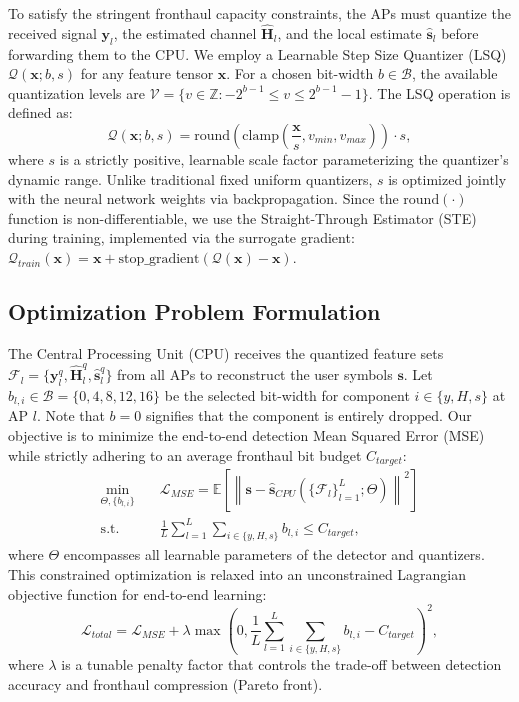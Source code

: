 To satisfy the stringent fronthaul capacity constraints, the APs must quantize the received signal $\mathbf{y}_l$, the estimated channel $\hat{\mathbf{H}}_l$, and the local estimate $\hat{\mathbf{s}}_l$ before forwarding them to the CPU. We employ a Learnable Step Size Quantizer (LSQ) $\mathcal{Q}(\mathbf{x}; b, s)$ for any feature tensor $\mathbf{x}$. For a chosen bit-width $b \in \mathcal{B}$, the available quantization levels are $\mathcal{V} = \{v \in \mathbb{Z} : -2^{b-1} \le v \le 2^{b-1}-1\}$. The LSQ operation is defined as:
\begin{equation}
    \mathcal{Q}(\mathbf{x}; b, s) = \text{round}\left( \text{clamp}\left( \frac{\mathbf{x}}{s}, v_{min}, v_{max} \right) \right) \cdot s,
\end{equation}
where $s$ is a strictly positive, learnable scale factor parameterizing the quantizer's dynamic range. Unlike traditional fixed uniform quantizers, $s$ is optimized jointly with the neural network weights via backpropagation. Since the $\text{round}(\cdot)$ function is non-differentiable, we use the Straight-Through Estimator (STE) during training, implemented via the surrogate gradient: $\mathcal{Q}_{train}(\mathbf{x}) = \mathbf{x} + \text{stop\_gradient}(\mathcal{Q}(\mathbf{x}) - \mathbf{x})$.

\subsection{Optimization Problem Formulation}
The Central Processing Unit (CPU) receives the quantized feature sets $\mathcal{F}_l = \{\mathbf{y}_l^q, \hat{\mathbf{H}}_l^q, \hat{\mathbf{s}}_l^q\}$ from all APs to reconstruct the user symbols $\mathbf{s}$. Let $b_{l,i} \in \mathcal{B} = \{0, 4, 8, 12, 16\}$ be the selected bit-width for component $i \in \{y, H, s\}$ at AP $l$. Note that $b=0$ signifies that the component is entirely dropped. Our objective is to minimize the end-to-end detection Mean Squared Error (MSE) while strictly adhering to an average fronthaul bit budget $C_{target}$:
\begin{align}
    \min_{\Theta, \{b_{l,i}\}} \quad & \mathcal{L}_{MSE} = \mathbb{E} \left[ \left\| \mathbf{s} - \hat{\mathbf{s}}_{CPU}(\{\mathcal{F}_l\}_{l=1}^L; \Theta) \right\|^2 \right] \\
    \text{s.t.} \quad & \frac{1}{L} \sum_{l=1}^L \sum_{i \in \{y, H, s\}} b_{l,i} \le C_{target},
\end{align}
where $\Theta$ encompasses all learnable parameters of the detector and quantizers. This constrained optimization is relaxed into an unconstrained Lagrangian objective function for end-to-end learning:
\begin{equation}
    \mathcal{L}_{total} = \mathcal{L}_{MSE} + \lambda \max\left(0, \frac{1}{L} \sum_{l=1}^L \sum_{i \in \{y, H, s\}} b_{l,i} - C_{target}\right)^2,
\end{equation}
where $\lambda$ is a tunable penalty factor that controls the trade-off between detection accuracy and fronthaul compression (Pareto front).